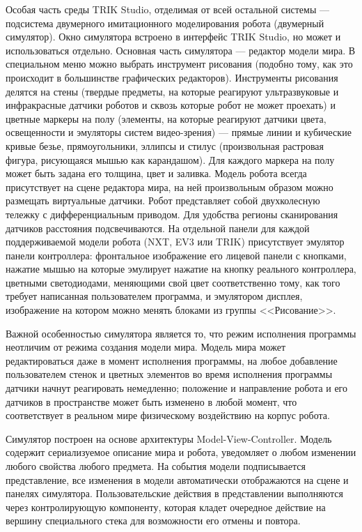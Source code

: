 \documentclass[conference]{IEEEtran}
\begin{document}
Особая часть среды TRIK Studio, отделимая от всей остальной системы --- подсистема двумерного имитационного моделирования робота (двумерный симулятор). Окно симулятора встроено в интерфейс TRIK Studio, но может и использоваться отдельно. Основная часть симулятора --- редактор модели мира. В специальном меню можно выбрать инструмент рисования (подобно тому, как это происходит в большинстве графических редакторов). Инструменты рисования делятся на стены (твердые предметы, на которые реагируют ультразвуковые и инфракрасные датчики роботов и сквозь которые робот не может проехать) и цветные маркеры на полу (элементы, на которые реагируют датчики цвета, освещенности и эмуляторы систем видео-зрения) --- прямые линии и кубические кривые безье, прямоугольники, эллипсы и стилус (произвольная растровая фигура, рисующаяся мышью как карандашом). Для каждого маркера на полу может быть задана его толщина, цвет и заливка. Модель робота всегда присутствует на сцене редактора мира, на ней произвольным образом можно размещать виртуальные датчики. Робот представляет собой двухколесную тележку с дифференциальным приводом. Для удобства регионы сканирования датчиков расстояния подсвечиваются. На отдельной панели для каждой поддерживаемой модели робота (NXT, EV3 или TRIK) присутствует эмулятор панели контроллера: фронтальное изображение его лицевой панели с кнопками, нажатие мышью на которые эмулирует нажатие на кнопку реального контроллера, цветными светодиодами, меняющими свой цвет соответственно тому, как того требует написанная пользователем программа, и эмулятором дисплея, изображение на котором можно менять блоками из группы <<Рисование>>.

Важной особенностью симулятора является то, что режим исполнения программы неотличим от режима создания модели мира. Модель мира может редактироваться даже в момент исполнения программы, на любое добавление пользователем стенок и цветных элементов во время исполнения программы датчики начнут реагировать немедленно; положение и направление робота и его датчиков в пространстве может быть изменено в любой момент, что соответствует в реальном мире физическому воздействию на корпус робота.

Симулятор построен на основе архитектуры Model-View-Controller. Модель содержит сериализуемое описание мира и робота, уведомляет о любом изменении любого свойства любого предмета. На события модели подписывается представление, все изменения в модели автоматически отображаются на сцене и панелях симулятора. Пользовательские действия в представлении выполняются через контролирующую компоненту, которая кладет очередное действие на вершину специального стека для возможности его отмены и повтора.
\end{document}
